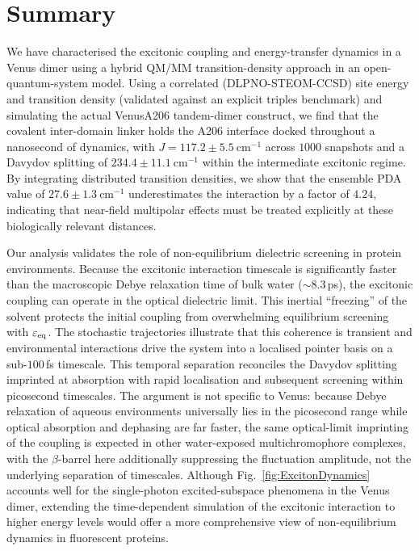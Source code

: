 \documentclass[journal=jpcbfk, manuscript=article, layout=twocolumn, doi=true]{achemso}
\begin{document}
\section{Summary}

We have characterised the excitonic coupling and energy-transfer dynamics in a Venus dimer using a hybrid QM/MM transition-density approach in an open-quantum-system model. Using a correlated (DLPNO-STEOM-CCSD) site energy and transition density (validated against an explicit triples benchmark) and simulating the actual VenusA206 tandem-dimer construct, we find that the covalent inter-domain linker holds the A206 interface docked throughout a nanosecond of dynamics, with $J=117.2\pm5.5~\mathrm{cm^{-1}}$ across $1000$ snapshots and a Davydov splitting of $234.4\pm11.1~\mathrm{cm^{-1}}$ within the intermediate excitonic regime. By integrating distributed transition densities, we show that the ensemble PDA value of $27.6\pm1.3~\mathrm{cm^{-1}}$ underestimates the interaction by a factor of $4.24$, indicating that near-field multipolar effects must be treated explicitly at these biologically relevant distances.

Our analysis validates the role of non-equilibrium dielectric screening in protein environments. Because the excitonic interaction timescale is significantly faster than the macroscopic Debye relaxation time of bulk water ($\sim 8.3$\,ps), the excitonic coupling can operate in the optical dielectric limit. This inertial ``freezing'' of the solvent protects the initial coupling from overwhelming equilibrium screening with $\varepsilon_{\rm eq}$. The stochastic trajectories illustrate that this coherence is transient and environmental interactions drive the system into a localised pointer basis on a sub-$100$\,fs timescale. This temporal separation reconciles the Davydov splitting imprinted at absorption with rapid localisation and subsequent screening within picosecond timescales. The argument is not specific to Venus: because Debye relaxation of aqueous environments universally lies in the picosecond range while optical absorption and dephasing are far faster, the same optical-limit imprinting of the coupling is expected in other water-exposed multichromophore complexes, with the $\beta$-barrel here additionally suppressing the fluctuation amplitude, not the underlying separation of timescales. Although Fig.~\ref{fig:ExcitonDynamics} accounts well for the single-photon excited-subspace phenomena in the Venus dimer, extending the time-dependent simulation of the excitonic interaction to higher energy levels would offer a more comprehensive view of non-equilibrium dynamics in fluorescent proteins.
\end{document}
